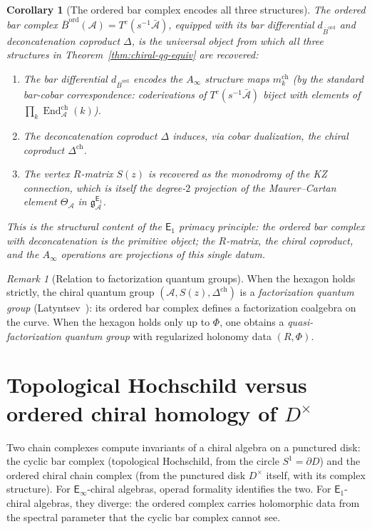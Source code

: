 \documentclass[11pt,reqno]{amsart}
\newtheorem{corollary}[theorem]{Corollary}
\theoremstyle{definition}
\theoremstyle{remark}
\newtheorem{remark}[theorem]{Remark}
\newcommand{\cA}{\mathcal{A}}
\newcommand{\Ainf}{A_{\infty}}
\newcommand{\Eone}{\mathsf{E}_{1}}
\newcommand{\Einf}{\mathsf{E}_{\infty}}
\DeclareMathOperator{\End}{End}
\newcommand{\gEone}{\mathfrak{g}^{\Eone}_{\cA}}
\newcommand{\Barord}{\overline{B}^{\mathrm{ord}}}
\numberwithin{equation}{section}
\begin{document}
\begin{corollary}[The ordered bar complex encodes all three
structures]
\label{cor:bar-encodes-all}
The ordered bar complex $\Barord(\cA) = T^c(s^{-1}\bar{\cA})$,
equipped with its bar differential $d_{\Barord}$ and
deconcatenation coproduct $\Delta$, is the universal
object from which all three structures in
Theorem~\textup{\ref{thm:chiral-qg-equiv}} are recovered:
\begin{enumerate}[label=\textup{(\roman*)}]
\item The bar differential $d_{\Barord}$ encodes the
  $\Ainf$ structure maps $m_k^{\mathrm{ch}}$
  \textup{(}by the standard bar-cobar correspondence:
  coderivations of $T^c(s^{-1}\bar{\cA})$ biject with
  elements of $\prod_k \End^{\mathrm{ch}}_\cA(k)$\textup{)}.
\item The deconcatenation coproduct $\Delta$ induces,
  via cobar dualization, the chiral coproduct
  $\Delta^{\mathrm{ch}}$.
\item The vertex $R$-matrix $S(z)$ is recovered as the
  monodromy of the KZ connection, which is itself the
  degree-$2$ projection of the Maurer--Cartan element
  $\Theta_\cA$ in $\gEone$.
\end{enumerate}
This is the structural content of the $\Eone$ primacy
principle: the ordered bar complex with deconcatenation
is the primitive object; the $R$-matrix, the chiral
coproduct, and the $\Ainf$ operations are projections of
this single datum.
\end{corollary}

\begin{remark}[Relation to factorization quantum groups]
\label{rem:factorization-qg}
When the hexagon holds strictly, the chiral quantum group
$(\cA, S(z), \Delta^{\mathrm{ch}})$ is a
\emph{factorization quantum group}
(Latyntsev~\cite{Latyntsev23}): its ordered bar complex
defines a factorization coalgebra on the curve. When the
hexagon holds only up to $\Phi$, one obtains a
\emph{quasi-factorization quantum group} with regularized
holonomy data $(R, \Phi)$.
\end{remark}


\section{Topological Hochschild versus ordered chiral
homology of $D^\times$}
\label{sec:hh-vs-ch}

Two chain complexes compute invariants of a chiral algebra
on a punctured disk: the cyclic bar complex
(topological Hochschild, from the circle
$S^1 = \partial D$) and the ordered chiral chain complex
(from the punctured disk $D^\times$ itself, with its
complex structure). For $\Einf$-chiral algebras, operad
formality identifies the two. For $\Eone$-chiral algebras,
they diverge: the ordered complex carries holomorphic data
from the spectral parameter that the cyclic bar complex
cannot see.
\end{document}

